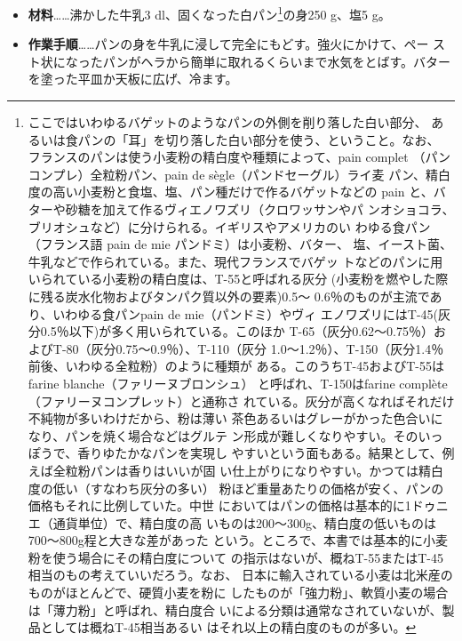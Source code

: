 \begin{recette}
\begin{itemize}
\item
  \textbf{材料}\ldots{}\ldots{}沸かした牛乳3
  dl、固くなった白パン\footnote{ここではいわゆるバゲットのようなパンの外側を削り落した白い部分、
    あるいは食パンの「耳」を切り落した白い部分を使う、ということ。なお、
    フランスのパンは使う小麦粉の精白度や種類によって、pain complet
    （パンコンプレ）全粒粉パン、pain de sègle（パンドセーグル）ライ麦
    パン、精白度の高い小麦粉と食塩、塩、パン種だけで作るバゲットなどの
    pain と、バターや砂糖を加えて作るヴィエノワズリ（クロワッサンやパ
    ンオショコラ、ブリオシュなど）に分けられる。イギリスやアメリカのい
    わゆる食パン（フランス語 pain de mie パンドミ）は小麦粉、バター、
    塩、イースト菌、牛乳などで作られている。また、現代フランスでバゲッ
    トなどのパンに用いられている小麦粉の精白度は、T-55と呼ばれる灰分
    (小麦粉を燃やした際に残る炭水化物およびタンパク質以外の要素)0.5〜
    0.6％のものが主流であり、いわゆる食パンpain de mie（パンドミ）やヴィ
    エノワズリにはT-45(灰分0.5％以下)が多く用いられている。このほか
    T-65（灰分0.62〜0.75％）およびT-80（灰分0.75〜0.9％）、T-110（灰分
    1.0〜1.2％）、T-150（灰分1.4％前後、いわゆる全粒粉）のように種類が
    ある。このうちT-45およびT-55はfarine blanche（ファリーヌブロンシュ）
    と呼ばれ、T-150はfarine complète（ファリーヌコンプレット）と通称さ
    れている。灰分が高くなればそれだけ不純物が多いわけだから、粉は薄い
    茶色あるいはグレーがかった色合いになり、パンを焼く場合などはグルテ
    ン形成が難しくなりやすい。そのいっぽうで、香りゆたかなパンを実現し
    やすいという面もある。結果として、例えば全粒粉パンは香りはいいが固
    い仕上がりになりやすい。かつては精白度の低い（すなわち灰分の多い）
    粉ほど重量あたりの価格が安く、パンの価格もそれに比例していた。中世
    においてはパンの価格は基本的に1ドゥニエ（通貨単位）で、精白度の高
    いものは200〜300g、精白度の低いものは700〜800g程と大きな差があった
    という。ところで、本書では基本的に小麦粉を使う場合にその精白度について
    の指示はないが、概ねT-55またはT-45相当のもの考えていいだろう。なお、
    日本に輸入されている小麦は北米産のものがほとんどで、硬質小麦を粉に
    したものが「強力粉」、軟質小麦の場合は「薄力粉」と呼ばれ、精白度合
    いによる分類は通常なされていないが、製品としては概ねT-45相当あるい
    はそれ以上の精白度のものが多い。}の身250 g、塩5 g。
\item
  \textbf{作業手順}\ldots{}\ldots{}パンの身を牛乳に浸して完全にもどす。強火にかけて、ペー
  スト状になったパンがヘラから簡単に取れるくらいまで水気をとばす。バター
  を塗った平皿か天板に広げ、冷ます。
\end{itemize}


\end{recette}
